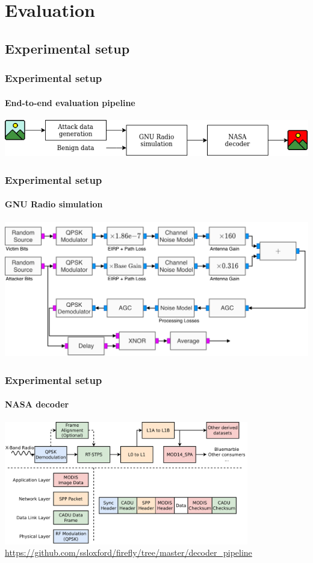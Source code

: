 \documentclass{beamer}
\begin{document}
\section{Evaluation}
\subsection{Experimental setup}

\begin{frame}
  \frametitle{Experimental setup}
  \framesubtitle{End-to-end evaluation pipeline}
  \includegraphics[width=\textwidth]{images/overall_simulation.png}
\end{frame}

\begin{frame}
  \frametitle{Experimental setup}
  \framesubtitle{GNU Radio simulation}
  \includegraphics[width=\textwidth]{images/overshadowing_pipeline.pdf}
\end{frame}

\begin{frame}
  \frametitle{Experimental setup}
  \framesubtitle{NASA decoder}
  \centering
  \includegraphics[width=0.8\textwidth]{images/attack_types.pdf}
  \url{https://github.com/ssloxford/firefly/tree/master/decoder_pipeline}
\end{frame}
\end{document}
